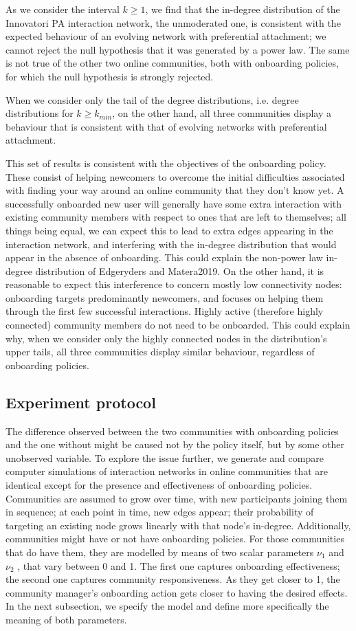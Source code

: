 \documentclass{nws}
\begin{document}
As we consider the interval  $k \geq 1$, we find that the in-degree distribution of the Innovatori PA interaction network, the unmoderated one, is consistent with the expected behaviour of an evolving network with preferential attachment; we cannot reject the null hypothesis that it was generated by a power law. The same is not true of the other two online communities, both with onboarding policies, for which the null hypothesis is strongly rejected.  

When we consider only the tail of the degree distributions, i.e. degree distributions for $k \geq k_{min}$, on the other hand, all three communities display a behaviour that is consistent with that of evolving networks with preferential attachment.

This set of results is consistent with the objectives of the onboarding policy. These consist of helping newcomers to overcome the initial difficulties associated with finding your way around an online community that they don't know yet. A successfully onboarded new user will generally have some extra interaction with existing community members with respect to ones that are left to themselves; all things being equal, we can expect this to lead to extra edges appearing in the interaction network, and interfering with the in-degree distribution that would appear in the absence of onboarding. This could explain the non-power law in-degree distribution of Edgeryders and Matera2019. On the other hand, it is reasonable to expect this interference to concern mostly low connectivity nodes: onboarding targets predominantly newcomers, and focuses on helping them through the first few successful interactions. Highly active (therefore highly connected) community members do not need to be onboarded. This could explain why, when we consider only the highly connected nodes in the distribution's upper tails, all three communities display similar behaviour, regardless of onboarding policies. 

\subsection{Experiment protocol}
The difference observed between the two communities with onboarding policies and the one without might be caused not by the policy itself, but by some other unobserved variable. To explore the issue further, we generate and compare computer simulations of interaction networks in online communities that are identical except for the presence and effectiveness of onboarding policies. Communities are assumed to grow over time, with new participants joining them in sequence; at each point in time, new edges appear; their probability of targeting an existing node grows linearly with that node's in-degree. Additionally, communities might have or not have onboarding policies. For those communities that do have them, they are modelled by means of two scalar parameters $\nu_1$  and $\nu_2$ , that vary between 0 and 1. The first one captures onboarding effectiveness;  the second one captures community responsiveness. As they get closer to 1, the community manager's onboarding action gets closer to having the desired effects. In the next subsection, we specify the model and define more specifically the meaning of both parameters.
\end{document}
